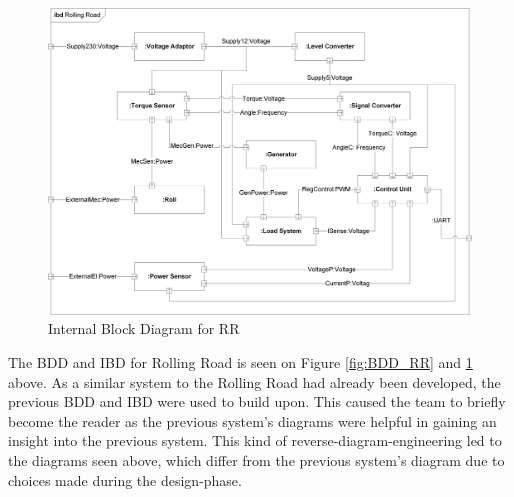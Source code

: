 \begin{figure}[H]
	\centering
	\includegraphics[width=1\linewidth]{Architecture/IBD_RR}
	\caption{Internal Block Diagram for RR}
	\label{fig:IBD_RR}
\end{figure}

The BDD and IBD for Rolling Road is seen on Figure \ref{fig:BDD_RR} and \ref{fig:IBD_RR} above. As a similar system to the Rolling Road had already been developed, the previous BDD and IBD were used to build upon. This caused the team to briefly become the reader as the previous system's diagrams were helpful in gaining an insight into the previous system. This kind of reverse-diagram-engineering led to the diagrams seen above, which differ from the previous system's diagram due to choices made during the design-phase.